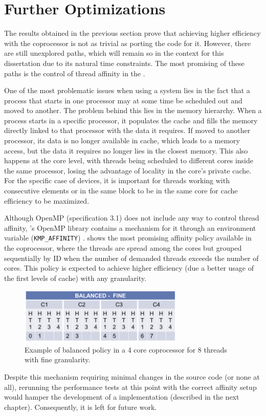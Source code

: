 \documentclass[../thesis]{subfiles}
\begin{document}
	\section{Further Optimizations}
	\label{sec:mic:further}

	The results obtained in the previous section prove that achieving higher efficiency with the coprocessor is not as trivial as porting the code for it. However, there are still unexplored paths, which will remain so in the context for this dissertation due to its natural time constraints. The most promising of these paths is the control of thread affinity in the \intel\xeonphi.

	One of the most problematic issues when using a \numa system lies in the fact that a process that starts in one processor may at some time be scheduled out and moved to another. The problem behind this lies in the memory hierarchy. When a process starts in a specific processor, it populates the cache and fills the memory directly linked to that processor with the data it requires. If moved to another processor, its data is no longer available in cache, which leads to a memory access, but the data it requires no longer lies in the closest memory. This also happens at the core level, with threads being scheduled to different cores inside the same processor, losing the advantage of locality in the core's private cache. For the specific case of \intel\mic devices, it is important for threads working with consecutive elements or in the same block to be in the same core for cache efficiency to be maximized.

	Although OpenMP (specification 3.1) does not include any way to control thread affinity, \intel's OpenMP library contains a mechanism for it through an environment variable (\texttt{KMP\_AFFINITY}) \cite{PRACE:MIC:BestPracticeGuide,CESGA:MIC:Evaluation}.  shows the most promising affinity policy available in the coprocessor, where the threads are spread among the cores but grouped sequentially by ID when the number of demanded threads exceeds the number of cores. This policy is expected to achieve higher efficiency (due a better usage of the first levels of cache) with any granularity.

	\begin{figure}
		\begin{center}
			\includegraphics[width=0.7\textwidth]{assets/images/kmp_affinity_balanced.png}
		\end{center}
		\caption{Example of balanced policy in a 4 core coprocessor for 8 threads with fine granularity.}
		\label{fig:kmp_affinity:balanced}
	\end{figure}

	Despite this mechanism requiring minimal changes in the source code (or none at all), rerunning the performance tests at this point with the correct affinity setup would hamper the development of a \cuda implementation (described in the next chapter). Consequently, it is left for future work.
\end{document}
